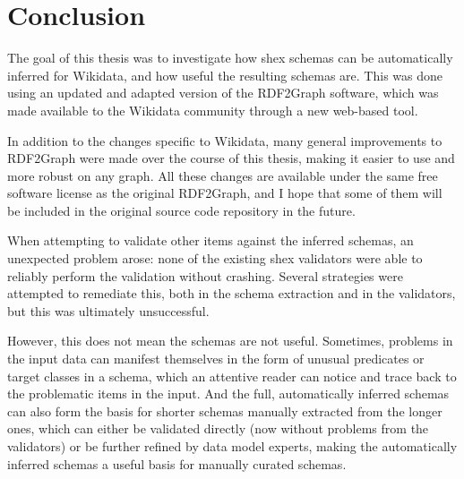 
\chapter{Conclusion}
\label{ch:Conclusion}

The goal of this thesis was to investigate how \gls{shex} schemas can be automatically inferred for Wikidata,
and how useful the resulting schemas are.
This was done using an updated and adapted version of the RDF2Graph software,
which was made available to the Wikidata community
through a new web-based tool.

In addition to the changes specific to Wikidata,
many general improvements to RDF2Graph were made over the course of this thesis,
making it easier to use and more robust on any graph.
All these changes are available under the same free software license as the original RDF2Graph,
and I hope that some of them will be included in the original source code repository in the future.

When attempting to validate other items against the inferred schemas,
an unexpected problem arose:
none of the existing \gls{shex} validators were able to reliably perform the validation without crashing.
Several strategies were attempted to remediate this,
both in the schema extraction and in the validators,
but this was ultimately unsuccessful.

However, this does not mean the schemas are not useful.
Sometimes, problems in the input data can manifest themselves
in the form of unusual predicates or target classes in a schema,
which an attentive reader can notice and trace back to the problematic items in the input.
And the full, automatically inferred schemas
can also form the basis for shorter schemas manually extracted from the longer ones,
which can either be validated directly
(now without problems from the validators)
or be further refined by data model experts, %
making the automatically inferred schemas a useful basis for manually curated schemas.


